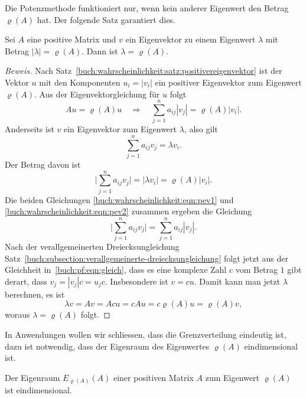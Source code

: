 Die Potenzmethode funktioniert nur, wenn kein anderer Eigenwert
den Betrag $\varrho(A)$ hat.
Der folgende Satz garantiert dies.

\begin{satz}
Sei $A$ eine positive Matrix und $v$ ein Eigenvektor zu einem 
Eigenwert $\lambda$ mit Betrag $|\lambda|=\varrho(A)$.
Dann ist $\lambda=\varrho(A)$.
\end{satz}

\begin{proof}[Beweis]
Nach Satz~\ref{buch:wahrscheinlichkeit:satz:positivereigenvektor}
ist der Vektor $u$ mit den Komponenten $u_i=|v_i|$ ein positiver
Eigenvektor zum Eigenwert $\varrho(A)$.
Aus der Eigenvektorgleichung für $u$ folgt
\begin{equation}
Au = \varrho(A) u
\quad\Rightarrow\quad
\sum_{j=1}^n a_{i\!j}|v_j| = \varrho(A) |v_i|.
\label{buch:wahrscheinlichkeit:eqn:pev1}
\end{equation}
Anderseits ist $v$ ein Eigenvektor zum Eigenwert $\lambda$, also gilt
\[
\sum_{j=1}^n a_{i\!j}v_j = \lambda v_i.
\]
Der Betrag davon ist
\begin{equation}
\biggl|
\sum_{j=1}^n a_{i\!j}v_j
\biggr|
=
|\lambda v_i|
=
\varrho(A) |v_i|.
\label{buch:wahrscheinlichkeit:eqn:pev2}
\end{equation}
Die beiden Gleichungen
\eqref{buch:wahrscheinlichkeit:eqn:pev1}
und
\eqref{buch:wahrscheinlichkeit:eqn:pev2}
zusammen ergeben die Gleichung
\begin{equation}
\biggl|
\sum_{j=1}^n a_{i\!j}v_j
\biggr|
=
\sum_{j=1}^n a_{i\!j}|v_j|.
\label{buch:pf:eqn:gleich}
\end{equation}
Nach der verallgemeinerten Dreiecksungleichung
Satz~\ref{buch:subsection:verallgemeinerte-dreiecksungleichung}
folgt jetzt aus der Gleichheit in~\eqref{buch:pf:eqn:gleich},
dass es eine komplexe Zahl $c$ vom Betrag $1$ gibt derart,
dass $v_j = |v_j|c=u_jc$.
Insbesondere ist $v=cu$.
Damit kann man jetzt $\lambda$ berechnen, es ist
\[
\lambda v = Av = Acu = c Au = c\varrho(A) u = \varrho(A) v,
\]
woraus $\lambda=\varrho(A)$ folgt.
\end{proof}

In Anwendungen wollen wir schliessen, dass die Grenzverteilung
eindeutig ist, dazu ist notwendig, dass der Eigenraum des
Eigenwertes $\varrho(A)$ eindimensional ist.

\begin{satz}
\label{buch:wahrscheinlichkeit:satz:geometrischeinfach}
Der Eigenraum $E_{\varrho(A)}(A)$ einer positiven Matrix $A$
zum Eigenwert $\varrho(A)$ ist eindimensional.
\end{satz}

